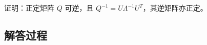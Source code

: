\begin{example}[正定矩阵逆矩阵]
    证明：正定矩阵 \( Q \) 可逆，且 \( Q^{-1} = U \Lambda^{-1} U^T \)，其逆矩阵亦正定。
    \end{example}
    
    \subsection*{解答过程}
    